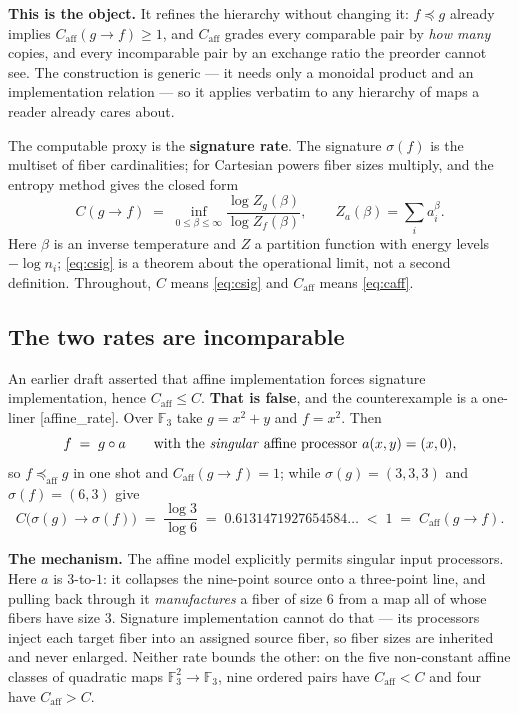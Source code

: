 \documentclass[11pt]{article}
\theoremstyle{plain}
\theoremstyle{remark}
\newcommand{\F}{\mathbb F}
\newcommand{\impl}{\preccurlyeq}
\newcommand{\caff}{C_{\mathrm{aff}}}
\newcommand{\ra}{\rightarrow}
\newcommand{\source}[1]{{\normalfont\small\textsf{[#1]}}}
\begin{document}
\textbf{This is the object.}  It refines the hierarchy without changing it:
$f \impl g$ already implies $\caff(g\ra f) \ge 1$, and $\caff$ grades every
comparable pair by \emph{how many} copies, and every incomparable pair by an
exchange ratio the preorder cannot see.  The construction is generic --- it
needs only a monoidal product and an implementation relation --- so it applies
verbatim to any hierarchy of maps a reader already cares about.

The computable proxy is the \textbf{signature rate}.  The signature $\sigma(f)$
is the multiset of fiber cardinalities; for Cartesian powers fiber sizes
multiply, and the entropy method gives the closed form
\begin{equation}\label{eq:csig}
  C(g\ra f) \;=\; \inf_{0\le\beta\le\infty}
  \frac{\log Z_g(\beta)}{\log Z_f(\beta)},
  \qquad Z_a(\beta) = \sum_i a_i^{\beta}.
\end{equation}
Here $\beta$ is an inverse temperature and $Z$ a partition function with energy
levels $-\log n_i$; \eqref{eq:csig} is a theorem about the operational limit,
not a second definition.  Throughout, $C$ means \eqref{eq:csig} and $\caff$
means \eqref{eq:caff}.

\subsection{The two rates are incomparable}

An earlier draft asserted that affine implementation forces signature
implementation, hence $\caff \le C$.  \textbf{That is false}, and the
counterexample is a one-liner \source{affine\_rate}.  Over $\F_3$ take
$g = x^2+y$ and $f = x^2$.  Then
\[
  f \;=\; g \circ a \qquad\text{with the \emph{singular} affine processor }
  a(x,y) = (x,0),
\]
so $f \impl_{\mathrm{aff}} g$ in one shot and $\caff(g\ra f) = 1$; while
$\sigma(g) = (3,3,3)$ and $\sigma(f) = (6,3)$ give
\begin{equation}\label{eq:incomparable}
  C\bigl(\sigma(g) \ra \sigma(f)\bigr)
  \;=\; \frac{\log 3}{\log 6} \;=\; 0.6131471927654584\ldots \;<\; 1
  \;=\; \caff(g\ra f).
\end{equation}

\textbf{The mechanism.}  The affine model explicitly permits singular input
processors.  Here $a$ is $3$-to-$1$: it collapses the nine-point source onto a
three-point line, and pulling back through it \emph{manufactures} a fiber of
size $6$ from a map all of whose fibers have size $3$.  Signature implementation
cannot do that --- its processors inject each target fiber into an assigned
source fiber, so fiber sizes are inherited and never enlarged.  Neither rate
bounds the other: on the five non-constant affine classes of quadratic maps
$\F_3^2 \ra \F_3$, nine ordered pairs have $\caff < C$ and four have
$\caff > C$.
\end{document}
